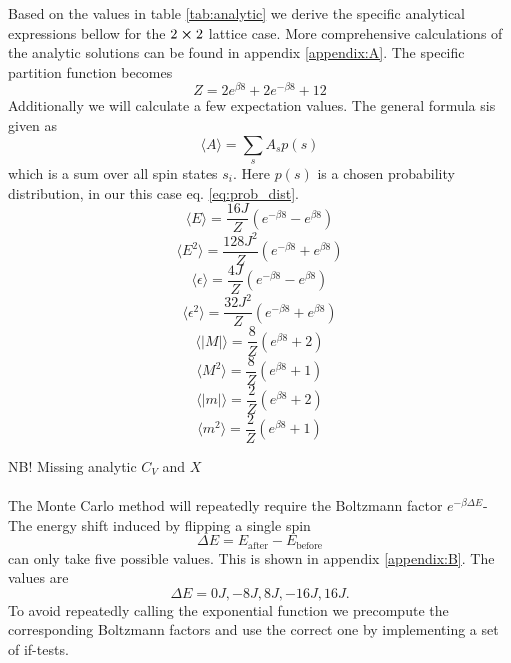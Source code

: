 \documentclass[english,notitlepage,reprint,nofootinbib]{revtex4-1}  %
\begin{document}
Based on the values in table \ref{tab:analytic} we derive the specific analytical expressions bellow for the $2 \cross 2$ lattice case. More comprehensive calculations of the analytic solutions can be found in appendix \ref{appendix:A}. The specific partition function becomes
\begin{equation}
    Z = 2 e^{\beta 8} + 2 e^{- \beta 8} + 12
\end{equation}
Additionally we will calculate a few expectation values. The general formula sis given as
\begin{equation}
    \langle A \rangle = \sum_s A_s p(s)
\end{equation}
which is a sum over all spin states $s_i$. Here $p(s)$ is a chosen probability distribution, in our this case eq. \ref{eq:prob_dist}.
\begin{equation}
    \langle E \rangle = \frac{16J}{Z} \left( e^{-\beta 8} - e^{\beta 8} \right)
\end{equation}
\begin{equation}
    \langle E^2 \rangle = \frac{128 J^2}{Z} \left( e^{-\beta 8} + e^{\beta 8} \right)
\end{equation}
\begin{equation}
    \langle \epsilon \rangle = \frac{4J}{Z} \left( e^{-\beta 8} - e^{\beta 8} \right)
\end{equation}
\begin{equation}
    \langle \epsilon^2 \rangle = \frac{32 J^2}{Z} \left( e^{-\beta 8} + e^{\beta 8} \right)
\end{equation}
\begin{equation}
    \langle |M| \rangle = \frac{8}{Z} \left( e^{\beta 8} + 2 \right)
\end{equation}
\begin{equation}
    \langle M^2 \rangle = \frac{8}{Z} \left( e^{\beta 8} + 1 \right)
\end{equation}
\begin{equation}
    \langle |m| \rangle = \frac{2}{Z} \left( e^{\beta 8} + 2 \right)
\end{equation}
\begin{equation}
    \langle m^2 \rangle = \frac{2}{Z} \left( e^{\beta 8} + 1 \right)
\end{equation}

NB! Missing analytic $C_V$ and $X$
\\ \\

The Monte Carlo method will repeatedly require the Boltzmann factor $e^{-\beta \Delta E}$- The energy shift induced by flipping a single spin 
\begin{equation}
    \Delta E = E_{\text{after}} - E_{\text{before}}
\end{equation}
can only take five possible values. This is shown in appendix \ref{appendix:B}. The values are
\begin{equation}
    \Delta E = 0J, -8J, 8J, -16J, 16J.
\end{equation}
To avoid repeatedly calling the exponential function we precompute the corresponding Boltzmann factors and use the correct one by implementing a set of if-tests. 
\end{document}
